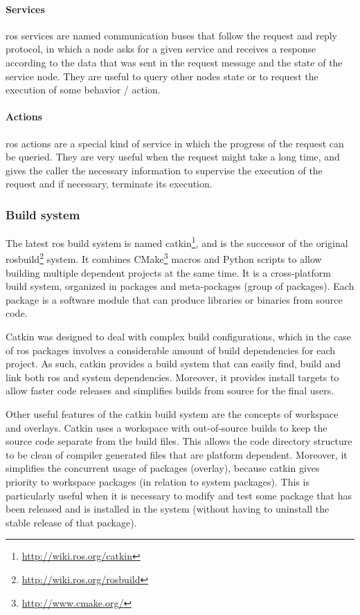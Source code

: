 \paragraph{Services}

\gls{ros} services are named communication buses that follow the request and reply protocol, in which a node asks for a given service and receives a response according to the data that was sent in the request message and the state of the service node. They are useful to query other nodes state or to request the execution of some behavior / action.


\paragraph{Actions}

\gls{ros} actions are a special kind of service in which the progress of the request can be queried. They are very useful when the request might take a long time, and gives the caller the necessary information to supervise the execution of the request and if necessary, terminate its execution.


\subsubsection{Build system}

The latest \gls{ros} build system is named catkin\footnote{\url{http://wiki.ros.org/catkin}}, and is the successor of the original rosbuild\footnote{\url{http://wiki.ros.org/rosbuild}} system. It combines CMake\footnote{\url{http://www.cmake.org/}} macros and Python scripts to allow building multiple dependent projects at the same time. It is a cross-platform build system, organized in packages and meta-packages (group of packages). Each package is a software module that can produce libraries or binaries from source code.

Catkin was designed to deal with complex build configurations, which in the case of \gls{ros} packages involves a considerable amount of build dependencies for each project. As such, catkin provides a build system that can easily find, build and link both \gls{ros} and system dependencies. Moreover, it provides install targets to allow faster code releases and simplifies builds from source for the final users.

Other useful features of the catkin build system are the concepts of workspace and overlays. Catkin uses a workspace with out-of-source builds to keep the source code separate from the build files. This allows the code directory structure to be clean of compiler generated files that are platform dependent. Moreover, it simplifies the concurrent usage of packages (overlay), because catkin gives priority to workspace packages (in relation to system packages). This is particularly useful when it is necessary to modify and test some package that has been released and is installed in the system (without having to uninstall the stable release of that package).

